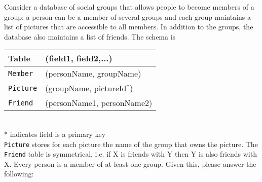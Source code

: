 



\question Consider a database of social groups that allows people to become
members of a group: a person can be a member of several groups and each group
maintains a list of pictures that are accessible to all members. In addition
to the groups, the database also maintains a list of friends. The schema is\\
\begin{tabular}{ll}
  Table   &(field1, field2,...) \\
  \hline
  \texttt{Member}  &(personName, groupName) \\  
  \texttt{Picture} &(groupName, pictureId$^{*}$) \\
  \texttt{Friend}  &(personName1, personName2) \\
  \hline
\end{tabular}\\
\small{* indicates field is a primary key}\\
\normalsize
\texttt{Picture} stores for each picture the name of the group that owns the 
picture. The \texttt{Friend} table is symmetrical, i.e. if X is friends with 
Y then Y is also friends with X. Every person is a member of at least one 
group. Given this, please answer the following:


